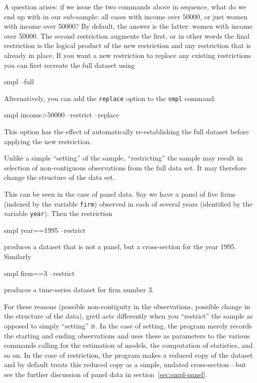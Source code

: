 A question arises: if we issue the two commands above in sequence,
what do we end up with in our sub-sample: all cases with income over
50000, or just women with income over 50000? By default, the answer is
the latter: women with income over 50000.  The second restriction
augments the first, or in other words the final restriction is the
logical product of the new restriction and any restriction that is
already in place.  If you want a new restriction to replace any
existing restrictions you can first recreate the full dataset using
%
\begin{code}
smpl --full
\end{code}
%
Alternatively, you can add the \verb+replace+ option to the
\verb+smpl+ command:
%
\begin{code}
smpl income>50000 --restrict --replace
\end{code}

This option has the effect of automatically re-establishing the full
dataset before applying the new restriction.

Unlike a simple ``setting'' of the sample, ``restricting'' the sample
may result in selection of non-contiguous observations from the full
data set.  It may therefore change the structure of the data set.

This can be seen in the case of panel data.  Say we have a panel of
five firms (indexed by the variable \verb+firm+) observed in each of
several years (identified by the variable \verb+year+).  Then the
restriction
%
\begin{code}
smpl year==1995 --restrict
\end{code}
%
produces a dataset that is not a panel, but a cross-section for the
year 1995.  Similarly
%
\begin{code}
smpl firm==3 --restrict
\end{code}
%
produces a time-series dataset for firm number 3.

For these reasons (possible non-contiguity in the observations,
possible change in the structure of the data), gretl acts differently
when you ``restrict'' the sample as opposed to simply ``setting'' it.
In the case of setting, the program merely records the starting and
ending observations and uses these as parameters to the various
commands calling for the estimation of models, the computation of
statistics, and so on. In the case of restriction, the program makes a
reduced copy of the dataset and by default treats this reduced copy as
a simple, undated cross-section---but see the further discussion of
panel data in section~\ref{sec:smpl-panel}.


